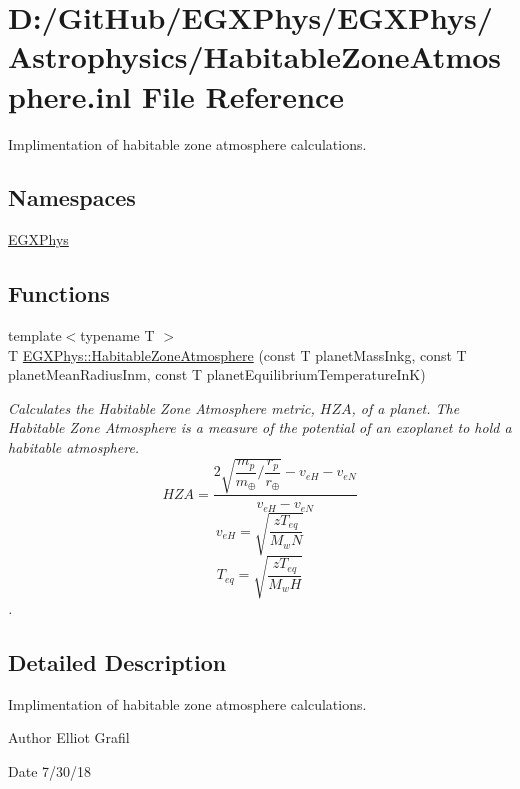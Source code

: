 \hypertarget{_habitable_zone_atmosphere_8inl}{}\section{D\+:/\+Git\+Hub/\+E\+G\+X\+Phys/\+E\+G\+X\+Phys/\+Astrophysics/\+Habitable\+Zone\+Atmosphere.inl File Reference}
\label{_habitable_zone_atmosphere_8inl}


Implimentation of habitable zone atmosphere calculations.  


\subsection*{Namespaces}
\begin{DoxyCompactItemize}
\item 
 \mbox{\hyperlink{namespace_e_g_x_phys}{E\+G\+X\+Phys}}
\end{DoxyCompactItemize}
\subsection*{Functions}
\begin{DoxyCompactItemize}
\item 
{\footnotesize template$<$typename T $>$ }\\T \mbox{\hyperlink{group___e_g_x_phys-_astrophysics-_habitable_zone_atmosphere_ga8cbf49b9a19cfe7a430f1528bb603950}{E\+G\+X\+Phys\+::\+Habitable\+Zone\+Atmosphere}} (const T planet\+Mass\+Inkg, const T planet\+Mean\+Radius\+Inm, const T planet\+Equilibrium\+Temperature\+InK)
\begin{DoxyCompactList}\small\item\em Calculates the Habitable Zone Atmosphere metric, $HZA$, of a planet. The Habitable Zone Atmosphere is a measure of the potential of an exoplanet to hold a habitable atmosphere. \[ HZA= \dfrac{ 2\sqrt{ \dfrac{m_p}{m_{\oplus}} / \dfrac{r_p}{r_{\oplus}} } -v_{eH} - v_{eN} }{v_{eH} - v_{eN}} \] \[ v_{eH}=\sqrt{ \dfrac{z T_{eq}}{ M_wN } } \] \[ T_{eq}=\sqrt{ \dfrac{z T_{eq}}{ M_wH } } \]. \end{DoxyCompactList}\end{DoxyCompactItemize}


\subsection{Detailed Description}
Implimentation of habitable zone atmosphere calculations. 

\begin{DoxyAuthor}{Author}
Elliot Grafil 
\end{DoxyAuthor}
\begin{DoxyDate}{Date}
7/30/18 
\end{DoxyDate}
